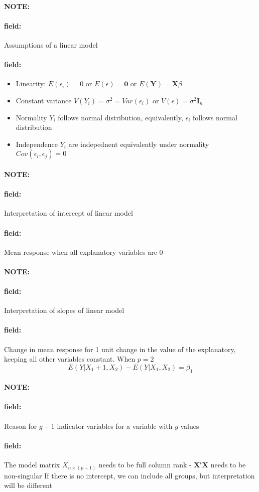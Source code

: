 \documentclass[12pt]{article}
\newenvironment{note}{\paragraph{NOTE:}}{}
\newenvironment{field}{\paragraph{field:}}{}
\begin{document}
\begin{note}
  \begin{field}
    Assumptions of a linear model
  \end{field}
  \begin{field}
    \begin{itemize}
      \item Linearity: $E(\epsilon_i) = 0$ or $E(\epsilon) = \mathbf{0}$ or $E(\mathbf{Y}) = \mathbf{X}\beta$
      \item Constant variance $V(Y_i) = \sigma^2 = Var(\epsilon_i)$ or $V(\epsilon) = \sigma^2 \mathbf{I}_n$
      \item Normality $Y_i$ follows normal distribution, equivalently, $\epsilon_i$ follows normal distribution
      \item Independence $Y_i$ are indepednent equivalently under normality $Cov(\epsilon_i, \epsilon_j) = 0$
    \end{itemize}
  \end{field}
\end{note}

\begin{note}
  \begin{field}
    Interpretation of intercept of linear model
  \end{field}
  \begin{field}
    Mean response when all explanatory variables are 0
  \end{field}
\end{note}



\begin{note}
  \begin{field}
    Interpretation of slopes of linear model
  \end{field}
  \begin{field}
    Change in mean response for 1 unit change in the value of the explanatory, keeping all other variables constant. When $p = 2$
    $$ E(Y|X_1 + 1, X_2) - E(Y|X_1,X_2) = \beta_1$$
  \end{field}
\end{note}

\begin{note}
  \begin{field}
    Reason for $g-1$ indicator variables for a variable with $g$ values
  \end{field}
  \begin{field}
    The model matrix $X_{n \times(p+1)}$ needs to be full column rank - $\mathbf{X}^t \mathbf{X}$ needs to be non-singular
    If there is no intercept, we can include all groups, but interpretation will be different
  \end{field}
\end{note}
\end{document}
